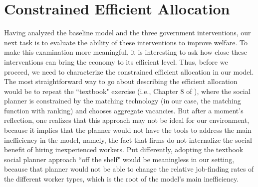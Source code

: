 \documentclass[12pt]{article} %
\theoremstyle{definition}
\begin{document}

\iffalse

\section{Constrained Efficient Allocation}\label{section planner} 

Having analyzed the baseline model and the three government interventions, our next task is to evaluate the ability of these interventions to improve welfare. To make this examination more meaningful, it is interesting to ask how close these interventions can bring the economy to its efficient level. Thus, before we proceed, we need to characterize the constrained efficient allocation in our model. The most straightforward way to go about describing the efficient allocation would be to repeat the ``textbook" exercise (i.e., Chapter 8 of \citealt{pissarides2000equilibrium}), where the social planner is constrained by the matching technology (in our case, the \citealt{petrongolo2001looking} matching function with ranking) and chooses aggregate vacancies. But after a moment's reflection, one realizes that this approach may not be ideal for our environment, because it implies that the planner would not have the tools to address the main inefficiency in the model, namely, the fact that firms do not internalize the social benefit of hiring inexperienced workers.
Put differently, adopting the textbook social planner approach ``off the shelf" would be meaningless in our setting, because that planner would not be able to change the relative job-finding rates of the different worker types, which is the root of the model's main inefficiency. 

\end{document}
